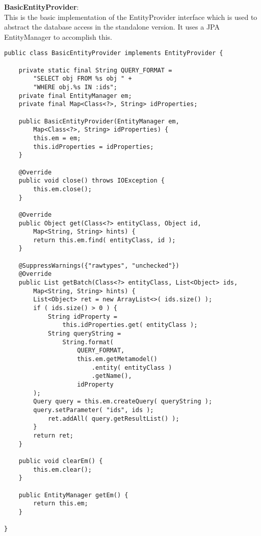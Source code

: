 \pagebreak

\noindent
\textbf{BasicEntityProvider}:\\
This is the basic implementation of the EntityProvider interface which is used to abstract the database access in the standalone version. It uses a JPA EntityManager to accomplish this.
\\
\lstset{language=java}
\begin{lstlisting}[frame=htrbl, caption={BasicEntityProvider.java}, label={lst:BasicEntityProvider.java}]
public class BasicEntityProvider implements EntityProvider {

	private static final String QUERY_FORMAT = 
		"SELECT obj FROM %s obj " +
		"WHERE obj.%s IN :ids";
	private final EntityManager em;
	private final Map<Class<?>, String> idProperties;

	public BasicEntityProvider(EntityManager em,
		Map<Class<?>, String> idProperties) {
		this.em = em;
		this.idProperties = idProperties;
	}

	@Override
	public void close() throws IOException {
		this.em.close();
	}

	@Override
	public Object get(Class<?> entityClass, Object id,
		Map<String, String> hints) {
		return this.em.find( entityClass, id );
	}

	@SuppressWarnings({"rawtypes", "unchecked"})
	@Override
	public List getBatch(Class<?> entityClass, List<Object> ids,
		Map<String, String> hints) {
		List<Object> ret = new ArrayList<>( ids.size() );
		if ( ids.size() > 0 ) {
			String idProperty = 
				this.idProperties.get( entityClass );
			String queryString = 
				String.format(
					QUERY_FORMAT,
					this.em.getMetamodel()
						.entity( entityClass )
						.getName(),
					idProperty
		);
		Query query = this.em.createQuery( queryString );
		query.setParameter( "ids", ids );
			ret.addAll( query.getResultList() );
		}
		return ret;
	}
	
	public void clearEm() {
		this.em.clear();
	}

	public EntityManager getEm() {
		return this.em;
	}

}
\end{lstlisting}

\pagebreak

